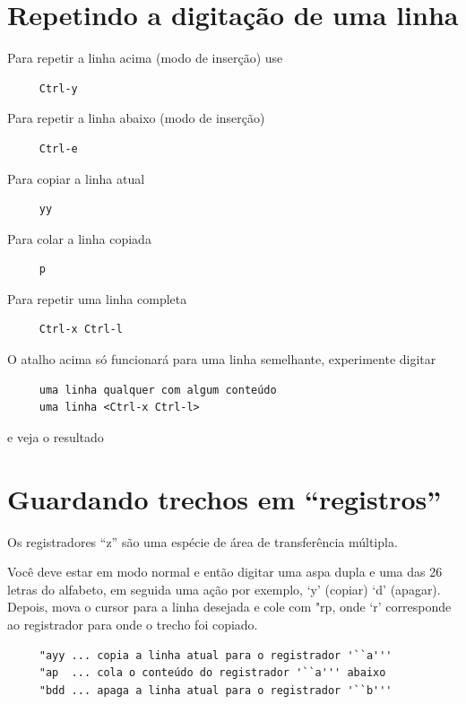 \documentclass[10pt,a4paper,openany]{book}
\begin{document}
\section{Repetindo a digitação de uma linha }
Para repetir a linha acima (modo de inserção) use

\begin{verbatim}
     Ctrl-y
\end{verbatim}

Para repetir a linha abaixo (modo de inserção)

\begin{verbatim}
     Ctrl-e
\end{verbatim}

Para copiar a linha atual

\begin{verbatim}
     yy
\end{verbatim}

Para colar a linha copiada

\begin{verbatim}
     p
\end{verbatim}

Para repetir uma linha completa

\begin{verbatim}
     Ctrl-x Ctrl-l
\end{verbatim}

O atalho acima só funcionará para uma linha semelhante, experimente
digitar

\begin{verbatim}
     uma linha qualquer com algum conteúdo
     uma linha <Ctrl-x Ctrl-l>
\end{verbatim}

e veja o resultado

\section{Guardando trechos em ``registros''}
\label{sec:Guardando trechos em ``registros''}

Os registradores ``z'' são uma espécie de área de transferência múltipla.

Você deve estar em modo normal e então digitar uma aspa dupla e uma
das 26 letras do alfabeto, em seguida uma ação por exemplo, `y'
(copiar) `d' (apagar). Depois, mova o cursor para a linha
desejada e cole com "rp, onde `r' corresponde ao
registrador para onde o trecho foi copiado.

\begin{verbatim}
     "ayy ... copia a linha atual para o registrador '``a'''
     "ap  ... cola o conteúdo do registrador '``a''' abaixo
     "bdd ... apaga a linha atual para o registrador '``b'''
\end{verbatim}
\end{document}

